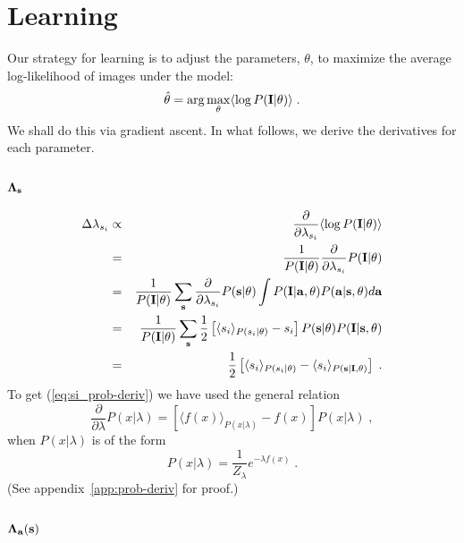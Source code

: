 \documentclass[12pt]{article}
\newcommand{\params}{\theta}
\newcommand{\ba}{{\bf a}}
\newcommand{\bs}{{\bf s}}
\newcommand{\bI}{{\bf I}}
\newcommand{\bLambdas}{{\bf \Lambda_s}}
\newcommand{\bLambdaa}{{\bf \Lambda_a}}
\newcommand{\pd}[1]{\frac{\partial}{\partial #1}}
\begin{document}
\section{Learning}

Our strategy for learning is to adjust the parameters, $\params$, to maximize
the average log-likelihood of images under the model:
\begin{equation}
\hat{\params} = \arg\max_{\params} \langle \log P(\bI|\params) \rangle \; .
\end{equation}
We shall do this via gradient ascent.  In what follows, we derive the 
derivatives for each parameter.

\subsection{$\bLambdas$}

\begin{eqnarray}
\Delta \lambda_{s_i} & \propto &
   \pd{\lambda_{s_i}} \langle \log P(\bI|\params) \rangle \\
 & = & \frac{1}{P(\bI|\params)} \pd{\lambda_{s_i}} P(\bI|\params) \\
 & = & \frac{1}{P(\bI|\params)} 
          \sum_{\bs} \pd{\lambda_{s_i}} P(\bs|\params) 
          \int P(\bI|\ba,\params) P(\ba|\bs,\params) d\ba \\
 & = & \frac{1}{P(\bI|\params)} 
         \sum_{\bs} \frac{1}{2}\left[ \langle s_i \rangle_{P(s_i|\params)}
                                        - s_i \right] P(\bs|\params) 
           P(\bI|\bs,\params)
\label{eq:si_prob-deriv} \\
 & = & \frac{1}{2} \left[ \langle s_i \rangle_{P(s_i|\params)}
                         - \langle s_i \rangle_{P(\bs|\bI,\params)} \right] \; .
\end{eqnarray}
To get (\ref{eq:si_prob-deriv}) we have used the general relation
\begin{equation}
\pd{\lambda} P(x|\lambda) = 
  \left[ \langle f(x) \rangle_{P(x|\lambda)} - f(x) \right] P(x|\lambda)\; ,
\label{eq:prob-deriv}
\end{equation}
when $P(x|\lambda)$ is of the form
\begin{equation}
P(x|\lambda)=\frac{1}{Z_\lambda} e^{-\lambda f(x)} \; .
\end{equation}
(See appendix~\ref{app:prob-deriv} for proof.)


\subsection{$\bLambdaa(\bs)$}
\end{document}
